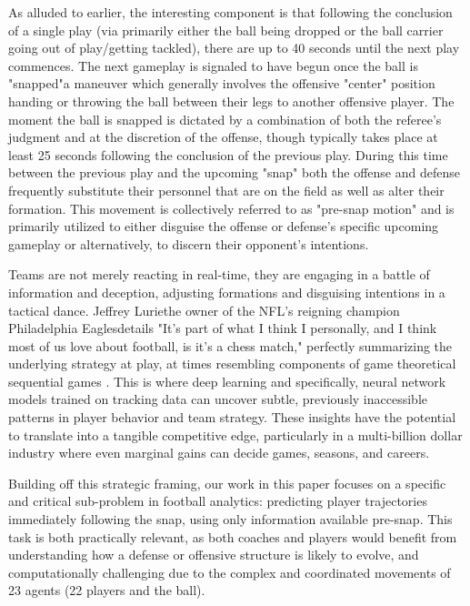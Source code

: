 \documentclass[sigconf]{acmart}
\begin{document}
As alluded to earlier, the interesting component is that following the conclusion of a single play (via primarily either the ball being dropped or the ball carrier going out of play/getting tackled), there are up to 40 seconds until the next play commences. The next gameplay is signaled to have begun once the ball is "snapped"\textemdash a maneuver which generally involves the offensive "center" position handing or throwing the ball between their legs to another offensive player. The moment the ball is snapped is dictated by a combination of both the referee's judgment and at the discretion of the offense, though typically takes place at least 25 seconds following the conclusion of the previous play. During this time between the previous play and the upcoming "snap" both the offense and defense frequently substitute their personnel that are on the field as well as alter their formation. This movement is collectively referred to as "pre-snap motion" and is primarily utilized to either disguise the offense or defense's specific upcoming gameplay or alternatively, to discern their opponent's intentions. 

Teams are not merely reacting in real-time, they are engaging in a battle of information and deception, adjusting formations and disguising intentions in a tactical dance. Jeffrey Lurie\textemdash the owner of the NFL's reigning champion Philadelphia Eagles\textemdash details "It's part of what I think I personally, and I think most of us love about football, is it's a chess match," perfectly summarizing the underlying strategy at play, at times resembling components of game theoretical sequential games \cite{Lurie2025}. This is where deep learning and specifically, neural network models trained on tracking data can uncover subtle, previously inaccessible patterns in player behavior and team strategy. These insights have the potential to translate into a tangible competitive edge, particularly in a multi-billion dollar industry where even marginal gains can decide games, seasons, and careers. 

Building off this strategic framing, our work in this paper focuses on a specific and critical sub-problem in football analytics: predicting player trajectories immediately following the snap, using only information available pre-snap. This task is both practically relevant, as both coaches and players would benefit from understanding how a defense or offensive structure is likely to evolve, and computationally challenging due to the complex and coordinated movements of 23 agents (22 players and the ball).
\end{document}
